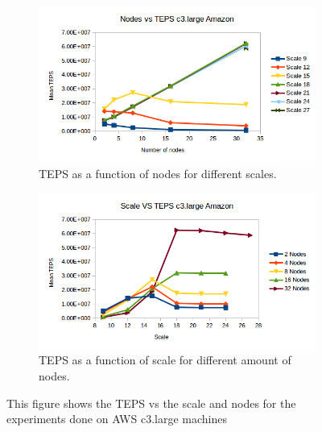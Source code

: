 \begin{figure}[!h]
	\centering
	\begin{subfigure}{.5\textwidth}
		\centering
		\includegraphics[width=\linewidth]{images/nodes_c3_amazon.png}
		\caption{TEPS as a function of nodes for different scales.}
		\label{fig:nodes_c3_amazon}
	\end{subfigure}%
	\begin{subfigure}{.5\textwidth}
		\centering
		\includegraphics[width=\linewidth]{images/scale_c3_amazon.png}
		\caption{TEPS as a function of scale for different amount of nodes.}
		\label{fig:scale_c3_amazon}
	\end{subfigure}
	\caption{This figure shows the TEPS vs the scale and nodes for the experiments done on AWS c3.large machines}
	\label{fig:c3_amazon}
\end{figure}

